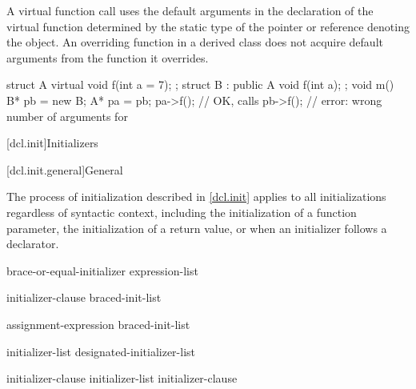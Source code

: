 \pnum
{}%
A virtual function call uses the default
arguments in the declaration of the virtual function determined
by the static type of the pointer or reference denoting the
object.
An overriding function in a derived class does not
acquire default arguments from the function it overrides.
\begin{example}
\begin{codeblock}
struct A {
  virtual void f(int a = 7);
};
struct B : public A {
  void f(int a);
};
void m() {
  B* pb = new B;
  A* pa = pb;
  pa->f();          // OK, calls 
  pb->f();          // error: wrong number of arguments for 
}
\end{codeblock}
\end{example}
%

[dcl.init]{Initializers}%

[dcl.init.general]{General}%

\pnum
The process of initialization described in \ref{dcl.init} applies to
all initializations regardless of syntactic context, including the
initialization of a function parameter, the
initialization of a return value, or when an
initializer follows a declarator.

\begin{bnf}
\br
    brace-or-equal-initializer\br
    \terminal{(} expression-list \terminal{)}
\end{bnf}

\begin{bnf}
\br
    \terminal{=} initializer-clause\br
    braced-init-list
\end{bnf}

\begin{bnf}
\br
    assignment-expression\br
    braced-init-list
\end{bnf}

\begin{bnf}
\br
    \terminal{\{} initializer-list \opt{\terminal{,}} \terminal{\}}\br
    \terminal{\{} designated-initializer-list \opt{\terminal{,}} \terminal{\}}\br
    \terminal{\{} \terminal{\}}
\end{bnf}

\begin{bnf}
\br
    initializer-clause \br
    initializer-list \terminal{,} initializer-clause 
\end{bnf}

